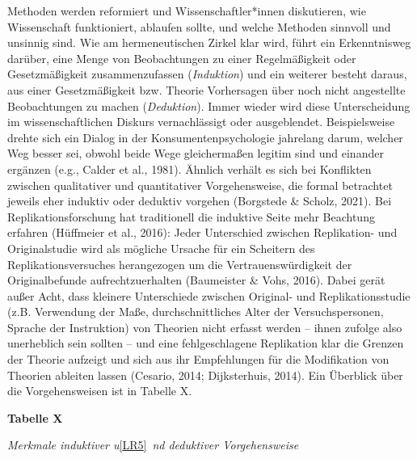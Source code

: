 \documentclass[
  letterpaper,
  DIV=11,
  numbers=noendperiod]{scrreprt}
\begin{document}
Methoden werden reformiert und Wissenschaftler*innen diskutieren, wie
Wissenschaft funktioniert, ablaufen sollte, und welche Methoden sinnvoll
und unsinnig sind. Wie am hermeneutischen Zirkel klar wird, führt ein
Erkenntnisweg darüber, eine Menge von Beobachtungen zu einer
Regelmäßigkeit oder Gesetzmäßigkeit zusammenzufassen (\emph{Induktion})
und ein weiterer besteht daraus, aus einer Gesetzmäßigkeit bzw. Theorie
Vorhersagen über noch nicht angestellte Beobachtungen zu machen
(\emph{Deduktion}). Immer wieder wird diese Unterscheidung im
wissenschaftlichen Diskurs vernachlässigt oder ausgeblendet.
Beispielsweise drehte sich ein Dialog in der Konsumentenpsychologie
jahrelang darum, welcher Weg besser sei, obwohl beide Wege gleichermaßen
legitim sind und einander ergänzen (e.g., Calder et al., 1981). Ähnlich
verhält es sich bei Konflikten zwischen qualitativer und quantitativer
Vorgehensweise, die formal betrachtet jeweils eher induktiv oder
deduktiv vorgehen (Borgstede \& Scholz, 2021). Bei Replikationsforschung
hat traditionell die induktive Seite mehr Beachtung erfahren (Hüffmeier
et al., 2016): Jeder Unterschied zwischen Replikation- und
Originalstudie wird als mögliche Ursache für ein Scheitern des
Replikationsversuches herangezogen um die Vertrauenswürdigkeit der
Originalbefunde aufrechtzuerhalten (Baumeister \& Vohs, 2016). Dabei
gerät außer Acht, dass kleinere Unterschiede zwischen Original- und
Replikationsstudie (z.B. Verwendung der Maße, durchschnittliches Alter
der Versuchspersonen, Sprache der Instruktion) von Theorien nicht
erfasst werden -- ihnen zufolge also unerheblich sein sollten -- und
eine fehlgeschlagene Replikation klar die Grenzen der Theorie aufzeigt
und sich aus ihr Empfehlungen für die Modifikation von Theorien ableiten
lassen (Cesario, 2014; Dijksterhuis, 2014). Ein Überblick über die
Vorgehensweisen ist in Tabelle X.

\textbf{Tabelle X}

\emph{Merkmale induktiver u}\hyperref[_msocom_5]{{[}LR5{]}}~\emph{nd
deduktiver Vorgehensweise}
\end{document}

